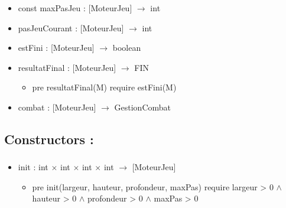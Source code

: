 \documentclass[11pt]{article}
\begin{document}
\begin{itemize}

\item const maxPasJeu : [MoteurJeu] $\to$ int\\
\label{sec-1.4.1.1}


\item pasJeuCourant : [MoteurJeu] $\to$ int\\
\label{sec-1.4.1.2}


\item estFini : [MoteurJeu] $\to$ boolean\\
\label{sec-1.4.1.3}


\item resultatFinal : [MoteurJeu] $\to$ FIN\\
\label{sec-1.4.1.4}

\begin{itemize}

\item pre resultatFinal(M) require estFini(M)\\
\label{sec-1.4.1.4.1}

\end{itemize} %

\item combat : [MoteurJeu] $\to$ GestionCombat\\
\label{sec-1.4.1.5}


\end{itemize} %
\subsection{Constructors :}
\label{sec-1.5}

\subsubsection{}

\begin{itemize}

\item init : int $\times$ int $\times$ int $\times$ int $\to$ [MoteurJeu]\\
\label{sec-1.5.1.1}

\begin{itemize}

\item pre init(largeur, hauteur, profondeur, maxPas) require largeur > 0 $\wedge$ hauteur > 0 $\wedge$ profondeur > 0 $\wedge$ maxPas > 0\\
\label{sec-1.5.1.1.1}


\end{itemize} %
\end{itemize} %
\end{document}
